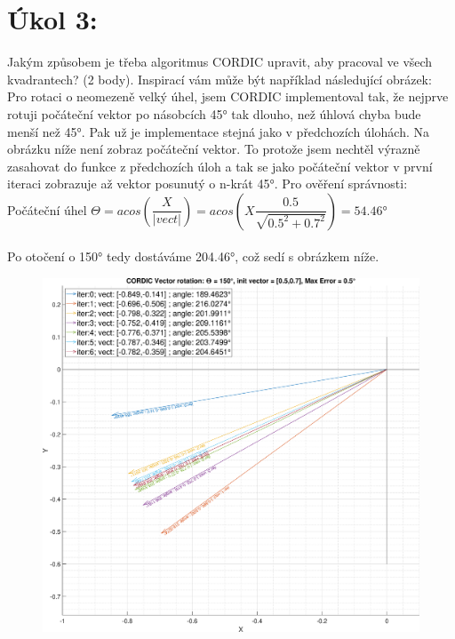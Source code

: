 \documentclass[10pt, a4paper]{article}%
\begin{document}
	\section{\Large Úkol 3:}
	Jakým způsobem je třeba algoritmus CORDIC upravit, aby pracoval ve všech kvadrantech? (2 body).
	Inspirací vám může být například následující obrázek:\\
	Pro rotaci o neomezeně velký úhel, jsem CORDIC implementoval tak, že nejprve rotuji počáteční vektor po násobcích
	45° tak dlouho, než úhlová chyba bude menší než 45°. Pak už je implementace stejná jako v předchozích úlohách.
	Na obrázku níže není zobraz počáteční vektor. To protože jsem nechtěl výrazně zasahovat do funkce z předchozích
	úloh a tak se jako počáteční vektor v první iteraci zobrazuje až vektor posunutý o n-krát 45°. Pro ověření správnosti:\\

	Počáteční úhel $\Theta = acos(\dfrac{X}{|vect|}) = acos\left(X\dfrac{0.5}{\sqrt{0.5^2 + 0.7^2}}\right) =  54.46$°\\\\
	Po otočení o 150° tedy dostáváme 204.46°, což sedí s obrázkem níže.
	\begin{figure}[ht!]
		\centering
		\includegraphics[width = 1\textwidth]{CORDIC_vect_trans_150.eps}
		
	\end{figure}
\end{document}
